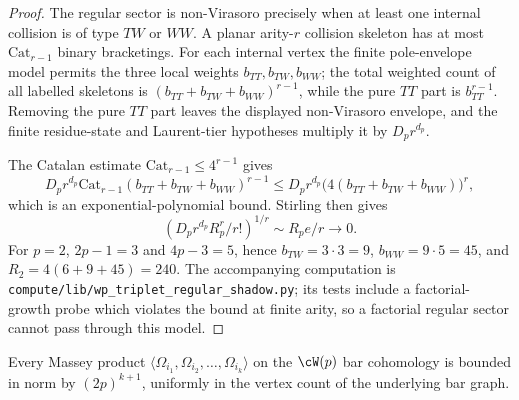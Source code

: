 \begin{proof}
The regular sector is non-Virasoro precisely when at least one internal
collision is of type $TW$ or $WW$. A planar arity-$r$ collision skeleton
has at most $\mathrm{Cat}_{r-1}$ binary bracketings. For each internal
vertex the finite pole-envelope model permits the three local weights
$b_{TT},b_{TW},b_{WW}$; the total weighted count of all labelled
skeletons is $(b_{TT}+b_{TW}+b_{WW})^{r-1}$, while the pure $TT$ part is
$b_{TT}^{r-1}$. Removing the pure $TT$ part leaves the displayed
non-Virasoro envelope, and the finite residue-state and Laurent-tier
hypotheses multiply it by $D_p r^{d_p}$.

The Catalan estimate $\mathrm{Cat}_{r-1}\le 4^{r-1}$ gives
\[
 D_p r^{d_p}\mathrm{Cat}_{r-1}
 (b_{TT}+b_{TW}+b_{WW})^{r-1}
 \le
 D_p r^{d_p}\bigl(4(b_{TT}+b_{TW}+b_{WW})\bigr)^r,
\]
which is an exponential-polynomial bound. Stirling then gives
\[
 \left(D_p r^{d_p}R_p^r/r!\right)^{1/r}
 \sim R_p e/r \longrightarrow 0.
\]
For $p=2$, $2p-1=3$ and $4p-3=5$, hence
$b_{TW}=3\cdot3=9$, $b_{WW}=9\cdot5=45$, and
$R_2=4(6+9+45)=240$. The accompanying computation is
\texttt{compute/lib/wp\_triplet\_regular\_shadow.py}; its tests include
a factorial-growth probe which violates the bound at finite
arity, so a factorial regular sector cannot pass through this model.
\end{proof}

\begin{conjecture}
\label{lem:wp-zhu-bounded-masseys}
Every Massey product
$\langle \Omega_{i_1}, \Omega_{i_2}, \ldots, \Omega_{i_k} \rangle$
on the $\cW(p)$ bar cohomology is bounded in norm by
$(2p)^{k+1}$, uniformly in the vertex count of the underlying bar
graph.
\end{conjecture}

